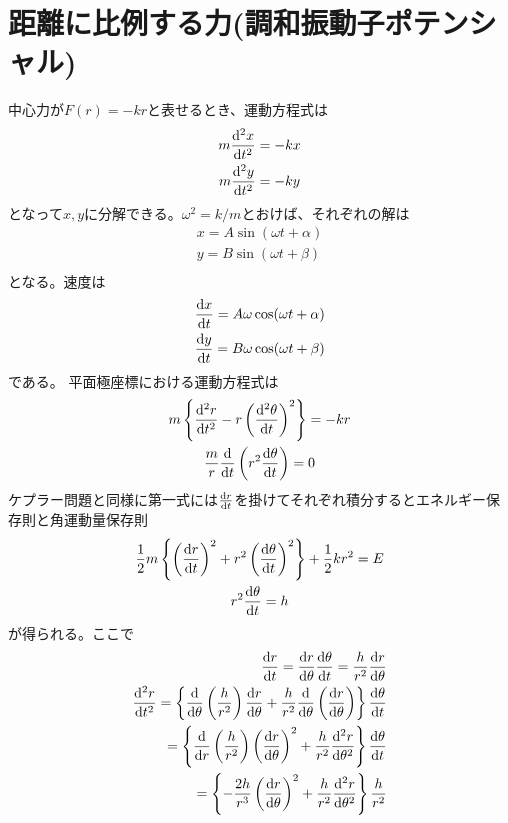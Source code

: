 
\section{距離に比例する力(調和振動子ポテンシャル)}
	中心力が$F(r) = -kr$と表せるとき、運動方程式は
	\begin{gather*}
		m\de[^2x]{t^2} = -kx\\
		m\de[^2y]{t^2} = -ky\\
	\end{gather*}
	となって$x, y$に分解できる。$\omega^2 = k/m$とおけば、それぞれの解は
	\begin{gather*}
		x = A\sin(\omega t + \alpha)\\
		y = B\sin(\omega t + \beta)\\
	\end{gather*}
	となる。速度は
	\begin{gather*}
		\de[x]{t} = A\omega\cos(\omega t + \alpha)\\
		\de[y]{t} = B\omega\cos(\omega t + \beta)\\
	\end{gather*}
	である。
	平面極座標における運動方程式は
	\begin{gather*}
		m \mlr{ \de[^2r]{t^2} - r\lr{ \de[^2\theta]{t} }^2 } = - kr\\
		\frac{m}{r} \de{t} \lr{ r^2\de[\theta]{t} } = 0\\
	\end{gather*}
	ケプラー問題と同様に第一式には$\de[r]{t}$を掛けてそれぞれ積分するとエネルギー保存則と角運動量保存則
	\begin{gather*}
		\frac{1}{2}m\mlr{ \lr{\de[r]{t}}^2 + r^2\lr{ \de[\theta]{t} }^2 } + \frac{1}{2}kr^2 = E\\
		r^2\de[\theta]{t} = h\\
	\end{gather*}
	が得られる。ここで
	\begin{align*}
		\de[r]{t} = \de[r]{\theta}\de[\theta]{t} = \frac{h}{r^2}\de[r]{\theta}\\
		\de[^2r]{t^2} = \mlr{ \de{\theta}\lr{\frac{h}{r^2}}\de[r]{\theta} + \frac{h}{r^2}\de{\theta}\lr{\de[r]{\theta}} }\de[\theta]{t}\\
		= \mlr{ \de{r}\lr{\frac{h}{r^2}}\lr{\de[r]{\theta}}^2 + \frac{h}{r^2}\de[^2r]{\theta^2} }\de[\theta]{t}\\
		= \mlr{ -\frac{2h}{r^3}\lr{\de[r]{\theta}}^2 + \frac{h}{r^2}\de[^2r]{\theta^2} }\frac{h}{r^2}\\
	\end{align*}
